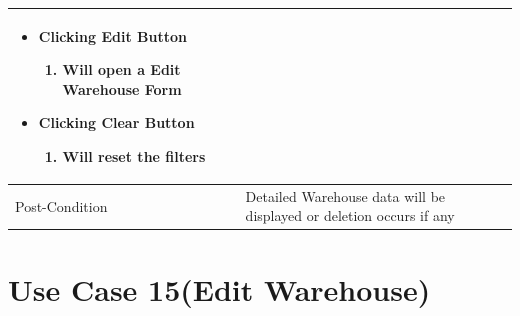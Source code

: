 \documentclass[12pt,a4paper]{report}
\begin{document}
\begin{tabular}{ | m{3cm} | m{12cm}| }
\begin{itemize}
\item Clicking Edit Button
	\begin{enumerate}
		\item Will open a Edit Warehouse Form
	\end{enumerate}
\item Clicking Clear Button
	\begin{enumerate}
	   	 \item	Will reset the filters
	\end{enumerate}
\end{itemize}
\\ \hline
Post-Condition &  Detailed Warehouse data will be displayed or deletion occurs if any   \\ \hline

\end{tabular}
\section{ Use Case 15(Edit Warehouse) }
\end{document}
